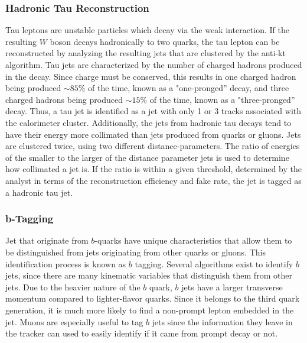 \subsubsection{Hadronic Tau Reconstruction}
\label{tau_reco_overview}

\par Tau leptons are unstable particles which decay via the weak
interaction.  If the resulting $W$ boson decays hadronically to two
quarks, the tau lepton can be reconstructed by analyzing the resulting
jets that are clustered by the anti-kt algorithm.  Tau jets are
characterized by the number of charged hadrons produced in the decay.
Since charge must be conserved, this results in one charged hadron
being produced $\sim85\%$ of the time, known as a "one-pronged''
decay, and three charged hadrons being produced $\sim15\%$ of the
time, known as a "three-pronged'' decay.  Thus, a tau jet is
identified as a jet with only 1 or 3 tracks associated with the
calorimeter cluster.  Additionally, the jets from hadronic tau 
decays tend to have their energy more collimated than jets produced
from quarks or gluons.  Jets are clustered twice, using two different
distance-parameters.  The ratio of energies of the smaller to the larger of the
distance parameter jets is used to determine how collimated a jet is.
If the ratio is within a given threshold, determined by the analyst in
terms of the reconstruction efficiency and fake rate, the jet is
tagged as a hadronic tau jet. 

\subsubsection{b-Tagging}
\label{b_tagging_overview}

\par Jet that originate from $b$-quarks have unique characteristics
that allow them to be distinguished from jets originating from other
quarks or gluons. This identification process is known as
$b$ tagging.  Several algorithms exist to identify $b$ jets, since
there are many kinematic variables that distinguish them from other
jets.  Due to the heavier nature of the $b$ quark, $b$ jets have
a larger transverse momentum compared to lighter-flavor quarks.
Since it belongs to the third quark generation, it is much more likely
to find a non-prompt lepton embedded in the jet.  Muons are especially
useful to tag $b$ jets since the information they leave in the tracker
can used to easily identify if it came from prompt decay or not.  

